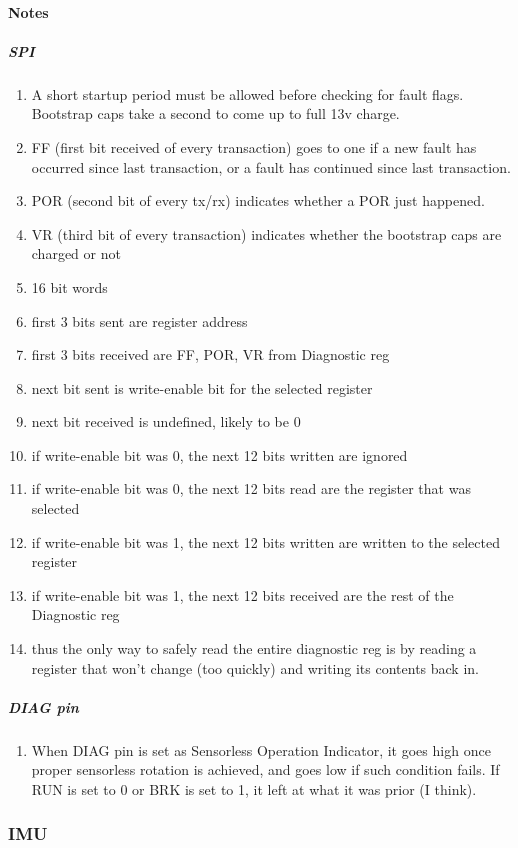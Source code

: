 \documentclass{scrreprt}
\begin{document}
	\paragraph{Notes}
	\subparagraph{SPI}
	\begin{enumerate}
		\item A short startup period must be allowed before checking for fault flags.  Bootstrap caps take a second to come up to full 13v charge.
		\item FF (first bit received of every transaction) goes to one if a new fault has occurred since last transaction, or a fault has continued since last transaction.
		\item POR (second bit of every tx/rx) indicates whether a POR just happened.
		\item VR (third bit of every transaction) indicates whether the bootstrap caps are charged or not
		\item 16 bit words
		\item first 3 bits sent are register address
		\item first 3 bits received are FF, POR, VR from Diagnostic reg
		\item next bit sent is write-enable bit for the selected register
		\item next bit received is undefined, likely to be 0
		\item if write-enable bit was 0, the next 12 bits written are ignored
		\item if write-enable bit was 0, the next 12 bits read are the register that was selected
		\item if write-enable bit was 1, the next 12 bits written are written to the selected register
		\item if write-enable bit was 1, the next 12 bits received are the rest of the Diagnostic reg
		\item thus the only way to safely read the entire diagnostic reg is by reading a register that won't change (too quickly) and writing its contents back in.
	\end{enumerate}
	\subparagraph{DIAG pin}
	\begin{enumerate}
		\item When DIAG pin is set as Sensorless Operation Indicator, it goes high once proper sensorless rotation is achieved, and goes low if such condition fails.  If RUN is set to 0 or BRK is set to 1, it left at what it was prior (I think).
	\end{enumerate}
	\subsubsection{IMU}
	
\end{document}
